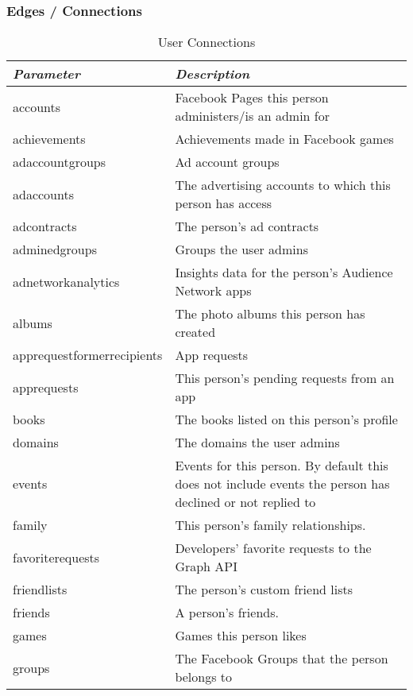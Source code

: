 \documentclass{article}
\begin{document}
	\subsubsection{Edges / Connections}
		\begin{table}[H]
		\centering
		\caption{User Connections}
		\label{edgeTable}
		\begin{tabularx}{\textwidth}{|l|X|}
		\hline
		\emph{\textbf{Parameter}} & \emph{\textbf{Description}} 	\\ \hline
		accounts 				& Facebook Pages this person administers/is an admin for \\ \hline
		achievements 				& Achievements made in Facebook games \\ \hline
		adaccountgroups 				& Ad account groups \\ \hline
		adaccounts 				& The advertising accounts to which this person has access \\ \hline
		adcontracts 				& The person's ad contracts \\ \hline
		admined\textunderscore groups 				& Groups the user admins \\ \hline
		adnetworkanalytics 				& Insights data for the person's Audience Network apps \\ \hline
		albums 				& The photo albums this person has created \\ \hline
		apprequestformerrecipients 				& App requests \\ \hline
		apprequests 				& This person's pending requests from an app \\ \hline
		books 				& The books listed on this person's profile \\ \hline
		domains 				& The domains the user admins \\ \hline
		events 				& Events for this person. By default this does not include events the person has declined or not replied to \\ \hline
		family 				& This person's family relationships. \\ \hline
		favorite\textunderscore requests 				& Developers' favorite requests to the Graph API \\ \hline
		friendlists 				& The person's custom friend lists \\ \hline
		friends 				& A person's friends. \\ \hline
		games 				& Games this person likes \\ \hline
		groups 				& The Facebook Groups that the person belongs to \\ \hline

\end{tabularx}
\end{table}
\end{document}
